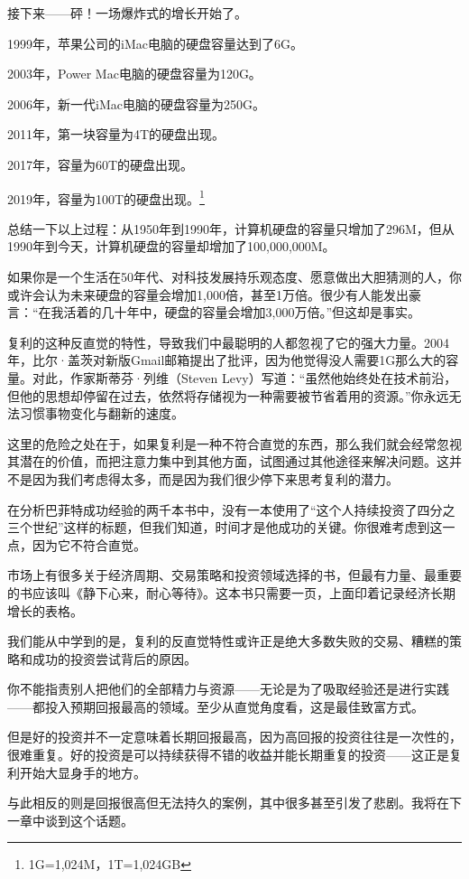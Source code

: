 接下来——砰！一场爆炸式的增长开始了。

1999年，苹果公司的iMac电脑的硬盘容量达到了6G。

2003年，Power Mac电脑的硬盘容量为120G。

2006年，新一代iMac电脑的硬盘容量为250G。

2011年，第一块容量为4T的硬盘出现。

2017年，容量为60T的硬盘出现。

2019年，容量为100T的硬盘出现。\footnote{1G=1,024M，1T=1,024GB}

总结一下以上过程：从1950年到1990年，计算机硬盘的容量只增加了296M，但从1990年到今天，计算机硬盘的容量却增加了100,000,000M。

如果你是一个生活在50年代、对科技发展持乐观态度、愿意做出大胆猜测的人，你或许会认为未来硬盘的容量会增加1,000倍，甚至1万倍。很少有人能发出豪言：“在我活着的几十年中，硬盘的容量会增加3,000万倍。”但这却是事实。

复利的这种反直觉的特性，导致我们中最聪明的人都忽视了它的强大力量。2004年，比尔·盖茨对新版Gmail邮箱提出了批评，因为他觉得没人需要1G那么大的容量。对此，作家斯蒂芬·列维（Steven Levy）写道：“虽然他始终处在技术前沿，但他的思想却停留在过去，依然将存储视为一种需要被节省着用的资源。”你永远无法习惯事物变化与翻新的速度。

这里的危险之处在于，如果复利是一种不符合直觉的东西，那么我们就会经常忽视其潜在的价值，而把注意力集中到其他方面，试图通过其他途径来解决问题。这并不是因为我们考虑得太多，而是因为我们很少停下来思考复利的潜力。

在分析巴菲特成功经验的两千本书中，没有一本使用了“这个人持续投资了四分之三个世纪”这样的标题，但我们知道，时间才是他成功的关键。你很难考虑到这一点，因为它不符合直觉。

市场上有很多关于经济周期、交易策略和投资领域选择的书，但最有力量、最重要的书应该叫《静下心来，耐心等待》。这本书只需要一页，上面印着记录经济长期增长的表格。

我们能从中学到的是，复利的反直觉特性或许正是绝大多数失败的交易、糟糕的策略和成功的投资尝试背后的原因。

你不能指责别人把他们的全部精力与资源——无论是为了吸取经验还是进行实践——都投入预期回报最高的领域。至少从直觉角度看，这是最佳致富方式。

但是好的投资并不一定意味着长期回报最高，因为高回报的投资往往是一次性的，很难重复。好的投资是可以持续获得不错的收益并能长期重复的投资——这正是复利开始大显身手的地方。

与此相反的则是回报很高但无法持久的案例，其中很多甚至引发了悲剧。我将在下一章中谈到这个话题。
